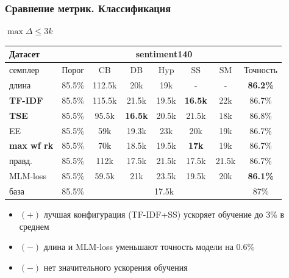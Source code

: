 \documentclass{beamer}
\begin{document}
\begin{frame}
	\frametitle{Сравнение метрик. Классификация}
	$\max\Delta \le 3k$
	\begin{table}
		\begin{tabular}{l|c|ccccc|c}
			Датасет & & \multicolumn{5}{c}{sentiment140}&\\
			\hline
			семплер & Порог & CB & DB & Hyp & SS & SM & Точность\\
			\hline
			длина & 85.5\% & 112.5k & 20k & 19k & - & - & {\bf 86.2\%} \\
			{\bf TF-IDF} & 85.5\% & 115.5k & 21.5k & 19.5k & {\bf 16.5k} & 22k & 86.7\% \\
			{\bf TSE} & 85.5\% & 95.5k & {\bf 16.5k} & 20.5k & 21.5k & 18k & 86.8\% \\
			EE & 85.5\% & 59k & 19.3k & 23k & 20k & 19k & 86.7\% \\
			{\bf max wf rk} & 85.5\% & 70k & 18.5k & 19.5k & {\bf 17k} & 19k & 86.7\% \\
			правд. & 85.5\% & 112k & 17.5k & 21.5k & 17.5k & 21.5k & 86.7\% \\
			MLM-loss & 85.5\% & 59.5k & 21k & 23.5k & 19.5k & 20k & {\bf 86.1\%} \\
			\hline
			база & 85.5\% & \multicolumn{5}{c}{17.5k} & 87\%
		\end{tabular}
	\end{table}
	\begin{itemize}
		\item {\bf\color{green}$(+)$} лучшая конфигурация (TF-IDF+SS) ускоряет обучение до 3\% в среднем
		\item {\bf\color{red}$(-)$} длина и MLM-loss уменьшают точность модели на 0.6\%
		\item {\bf\color{red}$(-)$} нет значительного ускорения обучения
	\end{itemize}
\end{frame}
\end{document}

